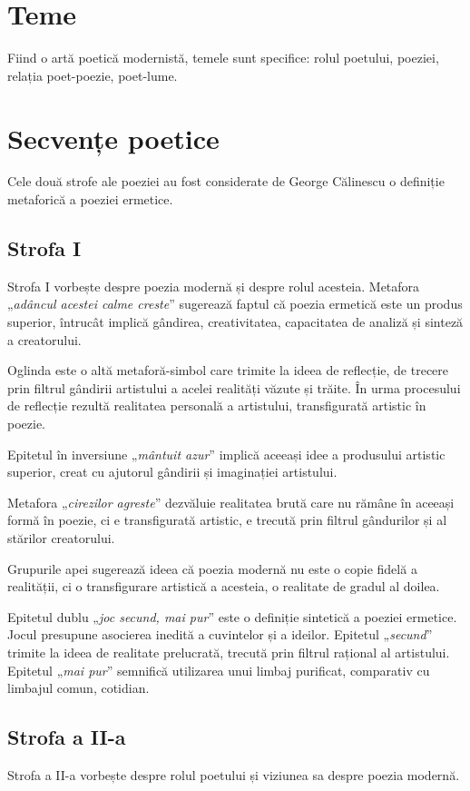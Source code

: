 \documentclass{article}
\newcommand{\qu}[1]{„\emph{#1}”}
\begin{document}
\section{Teme}
Fiind o artă poetică modernistă, temele sunt specifice: rolul poetului, poeziei, relația poet-poezie, poet-lume.

\section{Secvențe poetice}
Cele două strofe ale poeziei au fost considerate de George Călinescu o definiție metaforică a poeziei ermetice.

\subsection{Strofa I}
Strofa I vorbește despre poezia modernă și despre rolul acesteia. Metafora \qu{adâncul acestei calme creste} sugerează faptul că poezia ermetică este un produs superior, întrucât implică gândirea, creativitatea, capacitatea de analiză și sinteză a creatorului.

Oglinda este o altă metaforă-simbol care trimite la ideea de reflecție, de trecere prin filtrul gândirii artistului a acelei realități văzute și trăite. În urma procesului de reflecție rezultă realitatea personală a artistului, transfigurată artistic în poezie.

Epitetul în inversiune \qu{mântuit azur} implică aceeași idee a produsului artistic superior, creat cu ajutorul gândirii și imaginației artistului.

Metafora \qu{cirezilor agreste} dezvăluie realitatea brută care nu rămâne în aceeași formă în poezie, ci e transfigurată artistic, e trecută prin filtrul gândurilor și al stărilor creatorului.

Grupurile apei sugerează ideea că poezia modernă nu este o copie fidelă a realității, ci o transfigurare artistică a acesteia, o realitate de gradul al doilea.

Epitetul dublu \qu{joc secund, mai pur} este o definiție sintetică a poeziei ermetice. Jocul presupune asocierea inedită a cuvintelor și a ideilor. Epitetul \qu{secund} trimite la ideea de realitate prelucrată, trecută prin filtrul rațional al artistului. Epitetul \qu{mai pur} semnifică utilizarea unui limbaj purificat, comparativ cu limbajul comun, cotidian.

\subsection{Strofa a II-a}
Strofa a II-a vorbește despre rolul poetului și viziunea sa despre poezia modernă.
\end{document}
